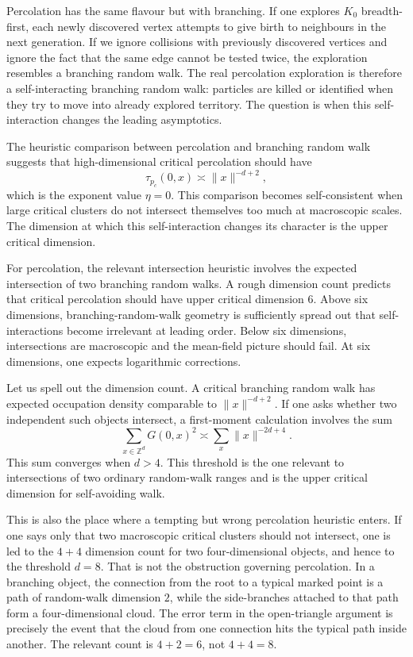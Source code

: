 \documentclass[11pt,reqno]{book}
\numberwithin{equation}{chapter}
\theoremstyle{plain}
\theoremstyle{definition}
\theoremstyle{remark}
\newcommand{\Z}{\mathbb Z}
\newcommand{\1}{\mathbf 1}
\newcommand{\norm}[1]{\lVert #1\rVert}
\newcommand{\as}{\asymp}
\begin{document}
Percolation has the same flavour but with branching. If one explores $K_0$ breadth-first, each newly discovered vertex attempts to give birth to neighbours in the next generation. If we ignore collisions with previously discovered vertices and ignore the fact that the same edge cannot be tested twice, the exploration resembles a branching random walk. The real percolation exploration is therefore a self-interacting branching random walk: particles are killed or identified when they try to move into already explored territory. The question is when this self-interaction changes the leading asymptotics.

The heuristic comparison between percolation and branching random walk suggests that high-dimensional critical percolation should have
\[
  \tau_{p_c}(0,x)\as \norm{x}^{-d+2},
\]
which is the exponent value $\eta=0$. This comparison becomes self-consistent when large critical clusters do not intersect themselves too much at macroscopic scales. The dimension at which this self-interaction changes its character is the upper critical dimension.

For percolation, the relevant intersection heuristic involves the expected intersection of two branching random walks. A rough dimension count predicts that critical percolation should have upper critical dimension $6$. Above six dimensions, branching-random-walk geometry is sufficiently spread out that self-interactions become irrelevant at leading order. Below six dimensions, intersections are macroscopic and the mean-field picture should fail. At six dimensions, one expects logarithmic corrections.

Let us spell out the dimension count. A critical branching random walk has expected occupation density comparable to $\norm{x}^{-d+2}$. If one asks whether two independent such objects intersect, a first-moment calculation involves the sum
\[
  \sum_{x\in\Z^d} G(0,x)^2
  \as
  \sum_x \norm{x}^{-2d+4}.
\]
This sum converges when $d>4$. This threshold is the one relevant to intersections of two ordinary random-walk ranges and is the upper critical dimension for self-avoiding walk.

This is also the place where a tempting but wrong percolation heuristic enters.
If one says only that two macroscopic critical clusters should not intersect,
one is led to the \(4+4\) dimension count for two four-dimensional objects,
and hence to the threshold \(d=8\). That is not the obstruction governing
percolation. In a branching object, the connection from the root to a typical
marked point is a path of random-walk dimension \(2\), while the side-branches
attached to that path form a four-dimensional cloud. The error term in the
open-triangle argument is precisely the event that the cloud from one
connection hits the typical path inside another. The relevant count is
\(4+2=6\), not \(4+4=8\).
\end{document}
